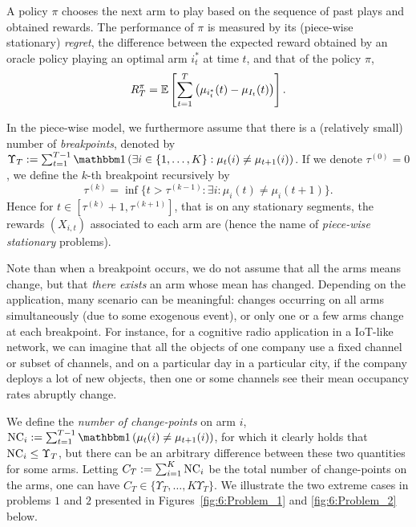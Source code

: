 A policy $\pi$ chooses the next arm to play based on the sequence of past plays and obtained rewards.
The performance of $\pi$ is measured by its (piece-wise stationary) \emph{regret}, the difference between the expected reward obtained by an oracle policy playing an optimal arm $i^*_t$ at time $t$, and that of the policy $\pi$,
%
\begin{equation}\label{def:6:nti}
    R_T^{\pi} = \mathbb{E}\left[\sum_{t=1}^T \left(\mu_{i^*_t}(t) - \mu_{I_t}(t)\right)\right].
\end{equation}


In the piece-wise \iid{} model, we furthermore assume that there is a (relatively small) number of \emph{breakpoints}, denoted by $\Upsilon_T:=\sum_{t=1}^{T-1} \indic\left(\exists i\in\{1,\dots,K\}: \mu_t(i) \neq \mu_{t+1}(i)\right)$.
If we denote $\tau^{(0)} = 0$, we define the $k$-th breakpoint recursively by
\begin{equation}
    \tau^{(k)} = \inf\{t > \tau^{(k-1)} : \exists i : \mu_i(t) \neq \mu_{i}(t+1)\}.
\end{equation}
%
Hence for $t\in[\tau^{(k)} + 1,\tau^{(k+1)}]$, that is on any stationary segments, the rewards $(X_{i,t})$ associated to each arm are \iid{} (hence the name of \emph{piece-wise stationary} problems).

Note than when a breakpoint occurs, we do not assume that all the arms means  change, but that \emph{there exists} an arm whose mean has changed.
Depending on the application, many scenario can be meaningful: changes occurring on all arms simultaneously (due to some exogenous event), or only one or a few arms change at each breakpoint.
For instance, for a cognitive radio application in a IoT-like network, we can imagine that all the objects of one company use a fixed channel or subset of channels, and on a particular day in a particular city, if the company deploys a lot of new objects, then one or some channels see their mean occupancy rates abruptly change.

We define the \emph{number of change-points} on arm $i$,
$\NCi := \sum_{t=1}^{T-1} \indic\left(\mu_t(i) \neq \mu_{t+1}(i)\right)$,
for which it clearly holds that
$\text{NC}_i \leq \Upsilon_T$, but there can be an arbitrary difference between these two quantities for some arms. Letting $C_T := \sum_{i=1}^K \text{NC}_i$ be the total number of change-points on the arms, one can have $C_T \in \{ \Upsilon_T, \dots, K\Upsilon_T \}$.
We illustrate the two extreme cases in problems $1$ and $2$ presented in Figures~\ref{fig:6:Problem_1} and \ref{fig:6:Problem_2} below.


